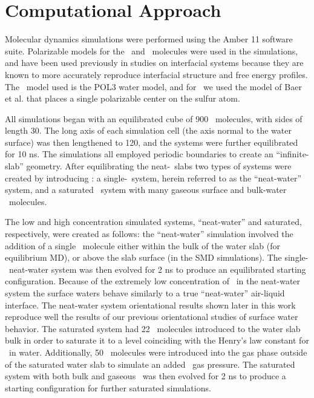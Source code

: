 \section{Computational Approach}

Molecular dynamics simulations were performed using the Amber 11 software suite.\cite{Case2010} Polarizable models for the \wat~and \suldiox~molecules were used in the simulations, and have been used previously in studies on interfacial systems because they are known to more accurately reproduce interfacial structure and free energy profiles.\cite{Wick2007,Rivera2006,Dang1998} The \wat~model used is the POL3 water model,\cite{Caldwell1995} and for \suldiox~we used the model of Baer et al. that places a single polarizable center on the sulfur atom.\cite{Baer2010}

All simulations began with an equilibrated cube of 900 \wat~molecules, with sides of length 30\angs. The long axis of each simulation cell (the axis normal to the water surface) was then lengthened to 120\angs, and the systems were further equilibrated for 10 ns. The simulations all employed periodic boundaries to create an ``infinite-slab'' geometry. After equilibrating the neat-\wat~slabs two types of systems were created by introducing \suldiox: a single-\suldiox~system, herein referred to as the ``neat-water'' system, and a saturated \suldiox~system with many gaseous surface and bulk-water \suldiox~molecules.

The low and high concentration simulated systems, ``neat-water'' and saturated, respectively, were created as follows: the ``neat-water'' simulation involved the addition of a single \suldiox~molecule either within the bulk of the water slab (for equilibrium MD), or above the slab surface (in the SMD simulations). The single-\suldiox~neat-water system was then evolved for 2 ns to produce an equilibrated starting configuration. Because of the extremely low concentration of \suldiox~in the neat-water system the surface waters behave similarly to a true ``neat-water'' air-liquid interface. The neat-water system orientational results shown later in this work reproduce well the results of our previous orientational studies of surface water behavior.\cite{Walker2006b,Hore2008} The saturated system had 22 \suldiox~molecules introduced to the water slab bulk in order to saturate it to a level coinciding with the Henry's law constant for \suldiox~in water. Additionally, 50 \suldiox~molecules were introduced into the gas phase outside of the saturated water slab to simulate an added \suldiox~gas pressure. The saturated system with both bulk and gaseous \suldiox~was then evolved for 2 ns to produce a starting configuration for further saturated simulations.

